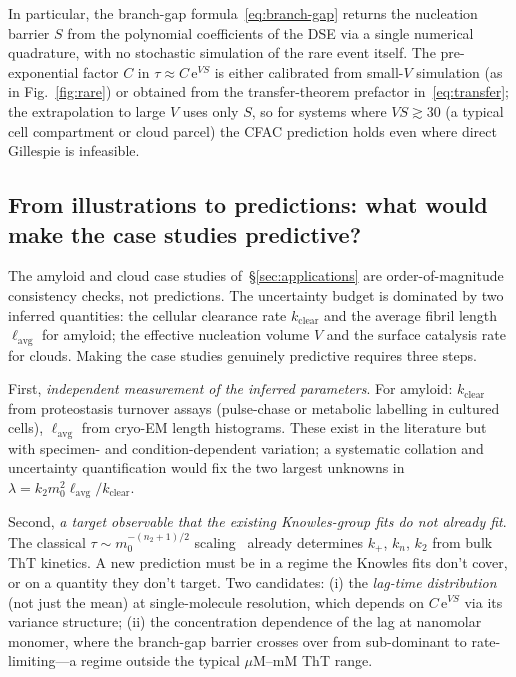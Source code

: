 \documentclass[11pt,a4paper]{article}
\newcommand{\ee}{\mathrm{e}}
\theoremstyle{plain}
\begin{document}
In particular, the branch-gap formula~\eqref{eq:branch-gap}
returns the nucleation barrier $S$ from the polynomial
coefficients of the DSE via a single numerical quadrature, with
no stochastic simulation of the rare event itself.  The
pre-exponential factor $C$ in $\tau \approx C\,\ee^{VS}$ is
either calibrated from small-$V$ simulation (as in
Fig.~\ref{fig:rare}) or obtained from the transfer-theorem
prefactor in~\eqref{eq:transfer}; the extrapolation to large $V$
uses only $S$, so for systems where $VS \gtrsim 30$ (a typical
cell compartment or cloud parcel) the CFAC prediction holds even
where direct Gillespie is infeasible.

\subsection{From illustrations to predictions: what would make the
case studies predictive?}

The amyloid and cloud case studies of~\S\ref{sec:applications}
are order-of-magnitude consistency checks, not predictions.  The
uncertainty budget is dominated by two inferred quantities:
the cellular clearance rate $k_{\mathrm{clear}}$ and the
average fibril length $\ell_{\mathrm{avg}}$ for amyloid; the
effective nucleation volume $V$ and the surface catalysis rate
for clouds.  Making the case studies genuinely predictive
requires three steps.

First, \emph{independent measurement of the inferred parameters}.
For amyloid: $k_{\mathrm{clear}}$ from proteostasis turnover
assays (pulse-chase or metabolic labelling in cultured cells),
$\ell_{\mathrm{avg}}$ from cryo-EM length histograms.  These exist
in the literature but with specimen- and condition-dependent
variation; a systematic collation and uncertainty quantification
would fix the two largest unknowns in $\lambda = k_2 m_0^2
\ell_{\mathrm{avg}}/k_{\mathrm{clear}}$.

Second, \emph{a target observable that the existing Knowles-group
fits do not already fit}.  The classical
$\tau \sim m_0^{-(n_2+1)/2}$ scaling~\citep{Knowles2009} already
determines $k_+$, $k_n$, $k_2$ from bulk ThT kinetics.  A new
prediction must be in a regime the Knowles fits don't cover, or
on a quantity they don't target.  Two candidates: (i) the
\emph{lag-time distribution} (not just the mean) at single-molecule
resolution, which depends on $C\,\ee^{VS}$ via its variance
structure; (ii) the concentration dependence of the lag at
nanomolar monomer, where the branch-gap barrier crosses over
from sub-dominant to rate-limiting---a regime outside the typical
$\mu$M--mM ThT range.
\end{document}
